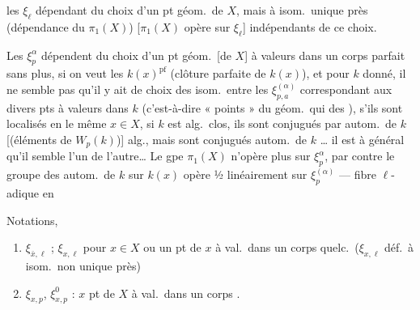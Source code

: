 
les $\xi_\ell$ \ill{} dépendant du choix d'un pt géom.\ de $X$, mais à
isom.\ unique près (dépendance du $\pi_1(X)$) [$\pi_1(X)$ opère sur
$\xi_\ell$]  indépendants de ce choix.

Les $\xi_p^{\alpha}$ dépendent du choix d'un  pt géom.\ [de
$X$] à valeurs dans un corps parfait sans plus, si on veut les
$k(x)^{\mathrm{pf}}$ (clôture parfaite de $k(x)$), et pour $k$ donné, il ne
semble pas qu'il y ait de choix des isom.\ entre les $\xi_{p,a}^{(\alpha)}$
correspondant aux divers pts à valeurs dans $k$ (c'est-à-dire « points
\ill{} » du \ill{} géom.\ qui \ill{} des ), s'ils sont
localisés en le même $x \in X$, \struck{\ill{}} \struck{\ill{}} si $k$ est
alg.\ clos, ils sont conjugués par autom.\ de $k$ [(éléments de
$W_p(k)$)] \ill{} alg., mais sont \ill{} conjugués \ill{} autom.\ de $k$
… il est à \ill{} général qu'il semble \ill{} l'un \ill{} de
l'autre… Le gpe $\pi_1(X)$ n'opère plus sur $\xi_p^{\alpha}$,
par contre le groupe des autom.\ de $k$ sur $k(x)$
\struck{\ill{}} opère ½ linéairement sur $\xi_p^{(\alpha)}$ ---
\ill{} fibre $\ell$-adique en \ill{}


Notations,
\begin{enumerate}
  \item[(i)] $\xi_{\bar{x},\ell}$ \ill{} ; $\xi_{x,\ell}$ \ill{} pour
  $x \in X$ ou un pt de $x$ à val.\ dans un corps quelc.\ ($\xi_{x,\ell}$
  déf.\ à isom.\ non unique près)
  \item[(ii)] $\xi_{x,p}$, $\xi_{x,p}^{0}$ : $x$ pt de $X$ à val.\ dans un
  corps .
\end{enumerate}


